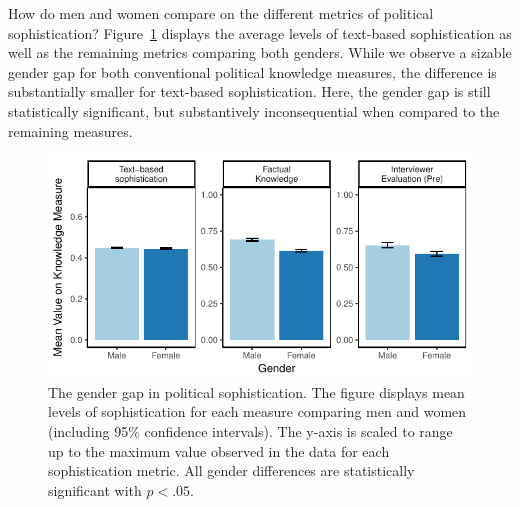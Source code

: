 \documentclass[12pt]{article}
\begin{document}

How do men and women compare on the different metrics of political sophistication? Figure~\ref{fig:meandiff} displays the average levels of text-based sophistication as well as the remaining metrics comparing both genders. While we observe a sizable gender gap for both conventional political knowledge measures, the difference is substantially smaller for text-based sophistication. Here, the gender gap is still statistically significant, but substantively inconsequential when compared to the remaining measures.

\begin{figure}[h]\centering
\includegraphics{../fig/meandiff_pres.pdf}
\caption{The gender gap in political sophistication. The figure displays mean levels of sophistication for each measure comparing men and women (including 95\% confidence intervals). The y-axis is scaled to range up to the maximum value observed in the data for each sophistication metric. All gender differences are statistically significant with $p<.05$.}\label{fig:meandiff}
\end{figure}
\end{document}

